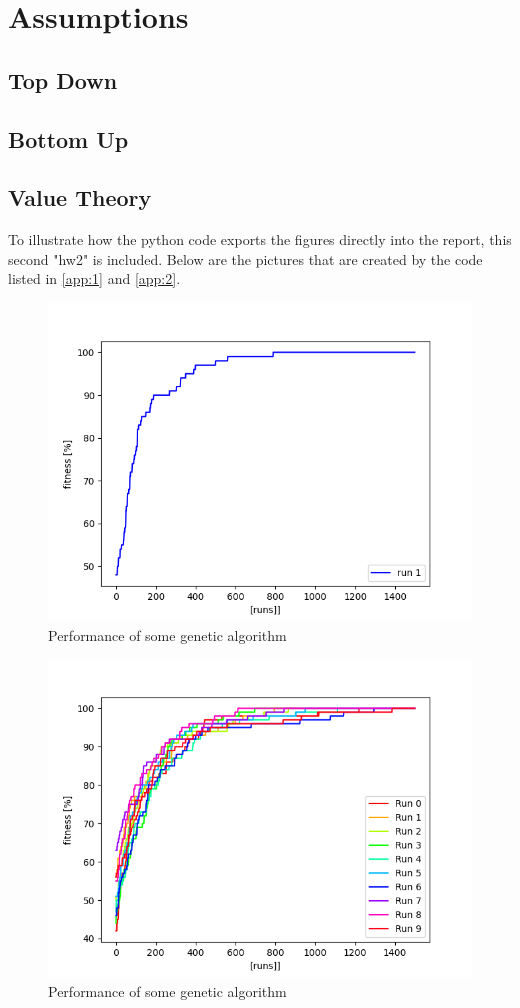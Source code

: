 \section{Assumptions}\label{sec:assumptions}
\subsection{Top Down}\label{subsec:assumptions_top_down}
\subsection{Bottom Up}\label{subsec:assumptions_bottom_up}
\subsection{Value Theory}\label{subsec:assumptions_value_theory}
To illustrate how the python code exports the figures directly into the report, this second "hw2" is included. Below are the pictures that are created by the code listed in \cref{app:1} and \cref{app:2}.
\begin{figure}[H]
    \centering
    \includegraphics[width=1\textwidth]{Images/4a.png}
    \caption{Performance of some genetic algorithm}
\end{figure}

\begin{figure}[H]
    \centering
    \includegraphics[width=1\textwidth]{Images/4b.png}
    \caption{Performance of some genetic algorithm}
\end{figure}